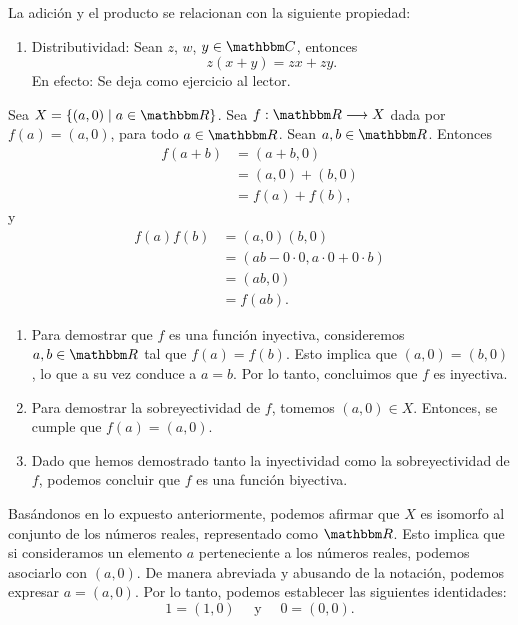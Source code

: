 La adición y el producto se relacionan con la siguiente propiedad:
\begin{enumerate}[resume,label=A\arabic*.]
    \item Distributividad: Sean $z$, $w$, $y \in \CC$, entonces
    $$z(x+y) = zx + zy.$$
    En efecto: Se deja como ejercicio al lector.
\end{enumerate}

\begin{observation}
    Sea $X=\{(a,  0) \mid a \in \RR \}$. Sea $f: \RR \longrightarrow X$ dada por $f(a)=(a,  0)$, para todo $a \in \RR$. Sean $a,  b \in \RR$. Entonces
    \begin{align*}
        f(a+b) &=(a+b,  0) \\
        & =(a,  0)+(b,  0) \\
        &=f(a)+f(b),
    \end{align*}
    y
    \begin{align*}
        f(a) f(b) &=(a,  0)(b,  0) \\
        & =(a b - 0 \cdot 0,  a \cdot 0 + 0 \cdot b) \\
        & =(a b,  0) \\
        & =f(a b).
    \end{align*}
    \begin{enumerate}[label=\roman*.]
        \item Para demostrar que $f$ es una función inyectiva, consideremos $a, b \in \RR$ tal que $f(a)=f(b)$. Esto implica que $(a,  0)=(b,  0)$, lo que a su vez conduce a $a=b$. Por lo tanto, concluimos que $f$ es inyectiva.
        \item Para demostrar la sobreyectividad de $f$, tomemos $(a, 0) \in X$. Entonces, se cumple que $f(a)=(a,  0)$.
        \item Dado que hemos demostrado tanto la inyectividad como la sobreyectividad de $f$, podemos concluir que $f$ es una función biyectiva.
    \end{enumerate}
    Basándonos en lo expuesto anteriormente, podemos afirmar que $X$ es isomorfo al conjunto de los números reales, representado como $\RR$. Esto implica que si consideramos un elemento $a$ perteneciente a los números reales, podemos asociarlo con $(a,  0)$. De manera abreviada y abusando de la notación, podemos expresar $a=(a,  0)$. Por lo tanto, podemos establecer las siguientes identidades:
    $$1=(1,  0) \quad \text{ y } \quad 0=(0,  0).$$
\end{observation}

